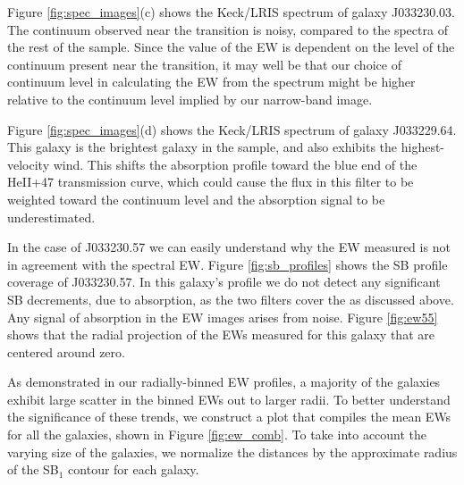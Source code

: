 \documentclass[twocolumn]{aastex61}
\begin{document}
Figure \ref{fig:spec_images}(c) shows the Keck/LRIS spectrum of galaxy J033230.03. The continuum observed near the  transition is noisy, compared to the spectra of the rest of the sample. Since the value of the EW is dependent on the level of the continuum present near the  transition, it may well be that our choice of continuum level in calculating the EW from the spectrum might be higher relative to the continuum level implied by our narrow-band image.

Figure \ref{fig:spec_images}(d) shows the Keck/LRIS spectrum of galaxy J033229.64. This galaxy is the brightest galaxy in the sample, and also exhibits the highest-velocity wind.  This shifts the  absorption profile toward the blue end of the 
HeII+47 transmission curve, which could cause the flux in this filter to be weighted toward the continuum level and the absorption signal to be underestimated.


In the case of J033230.57 we can easily understand why the EW measured is not in agreement with the spectral EW. Figure \ref{fig:sb_profiles}  shows the SB profile coverage of J033230.57. In this galaxy's profile we do not detect any significant SB decrements, due to absorption, as the two filters cover the  as discussed above. Any signal of absorption in the EW images arises from noise. Figure \ref{fig:ew55} shows that the radial projection of the EWs measured for this galaxy that are centered around zero.

As demonstrated in our radially-binned EW profiles,
a majority of the galaxies exhibit large scatter in the binned EWs out to larger radii. To better understand the significance of these trends, we construct a plot that compiles the mean EWs for all the galaxies, shown in Figure \ref{fig:ew_comb}. To take into account the varying size of the galaxies, we normalize the distances by the approximate radius of the SB$_1$ contour for each galaxy. 
\end{document}
